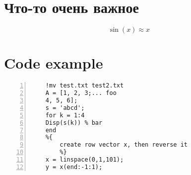 \setlength{\midchapskip}{20pt}
\renewcommand*{\afterchapternum}{\par\nobreak\vskip \midchapskip}
\renewcommand\thechapter{\Asbuk{chapter}} %

\chapter{Что-то очень важное}
\label{app:details}

\[
    \sin(x) \approx x
\]


\chapter{Code example}

\begin{lstlisting}[style=Matlab-editor, frame=single, numbers=left,]
	%% Пример кода Matlab
	!mv test.txt test2.txt
	A = [1, 2, 3;... foo
	4, 5, 6];
	s = 'abcd';
	for k = 1:4
	Disp(s(k)) % bar
	end
	%{
		create row vector x, then reverse it
		%}
	x = linspace(0,1,101);
	y = x(end:-1:1);
\end{lstlisting}
